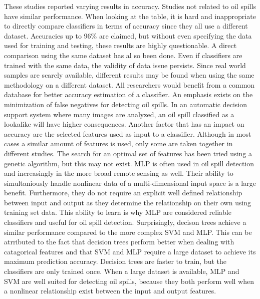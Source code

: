 These studies reported varying results in accuracy. Studies not related to oil spills have similar performance. When looking at the table, it is hard and inappropriate to directly compare classifiers in terms of accuracy since they all use a different dataset. Accuracies up to 96\% are claimed\cite{Topouzelis200924}, but without even specifying the data used for training and testing, these results are highly questionable. A direct comparison using the same dataset has al so been done\cite{Mera201472}\cite{Xu201414}. Even if classifiers are trained with the same data, the validity of data issue persists. Since real world samples are scarcly available, different results may be found when using the same methodology on a different dataset. All researchers would benefit from a common database for better accuracy estimation of a classifier\cite{Topouzelis200810}. An emphasis exists on the minimization of false negatives for detecting oil spills. In an automatic decision support system where many images are analyzed, an oil spill classified as a lookalike will have higher consequences. Another factor that has an impact on accuracy are the selected features used as input to a classifier. Although in most cases a similar amount of features is used, only some are taken together in different studies. The search for an optimal set of features has been tried using a genetic algorithm\cite{Topouzelis200930}, but this may not exist.
MLP is often used in oil spill detection and increasingly in the more broad remote sensing as well. Their ability to simultaniously handle nonlinear data of a multi-dimensional input space is a large benefit. Furthermore, they do not require an explicit well defined relationship between input and output as they determine the relationship on their own using training set data. This ability to learn is why MLP are considered reliable classifiers and useful for oil spill detection\cite{Delfrate200038}. Surprisingly, decison trees achieve a similar performance compared to the more complex SVM and MLP. This can be atrributed to the fact that decision trees perform better when dealing with catagorical features and that SVM and MLP require a large dataset to achieve its maximum prediction accuracy\cite{kotsiantis2007supervised}. Decision trees are faster to train, but the classifiers are only trained once. When a large dataset is available, MLP and SVM are well suited for detecting oil spills, because they both perform well when a nonlinear relationship exist between the input and output features\cite{kotsiantis2007supervised}.

